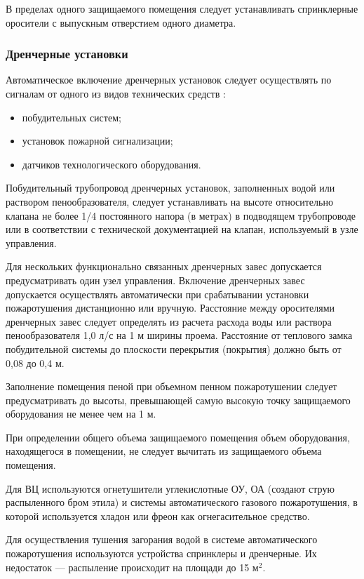 В пределах одного защищаемого помещения следует устанавливать спринклерные оросители с выпускным отверстием одного диаметра.
 
\subsubsection*{Дренчерные установки}
Автоматическое включение дренчерных установок следует осуществлять по сигналам от одного из видов технических средств
\cite{bjd421} \cite{bjd422}:
\begin{itemize}
\item побудительных систем;
\item установок пожарной сигнализации;
\item датчиков технологического оборудования.
\end{itemize}
 
Побудительный трубопровод дренчерных установок, заполненных водой или раствором пенообразователя, следует устанавливать на
высоте относительно клапана не более 1/4 постоянного напора (в метрах) в подводящем трубопроводе или в соответствии с
технической документацией на клапан, используемый в узле управления.

Для нескольких функционально связанных дренчерных завес допускается предусматривать один узел управления.
Включение дренчерных завес допускается осуществлять автоматически при срабатывании установки пожаротушения
дистанционно или вручную. Расстояние между оросителями дренчерных завес следует определять из расчета расхода
воды или раствора пенообразователя 1,0 л/с на 1 м ширины проема. Расстояние от теплового замка побудительной системы
до плоскости перекрытия (покрытия) должно быть от 0,08 до 0,4 м.

Заполнение помещения пеной при объемном пенном пожаротушении следует предусматривать до высоты, превышающей самую высокую
точку защищаемого оборудования не менее чем на 1 м.

При определении общего объема защищаемого помещения объем оборудования, находящегося в помещении, не следует вычитать
из защищаемого объема помещения.


Для ВЦ используются огнетушители углекислотные ОУ, ОА (создают струю распыленного бром этила) и системы автоматического
газового пожаротушения, в которой используется хладон или фреон как огнегасительное средство.

Для осуществления тушения загорания водой в системе автоматического пожаротушения используются устройства спринклеры и дренчерные.
Их недостаток — распыление происходит на площади до 15 м$^2$.

